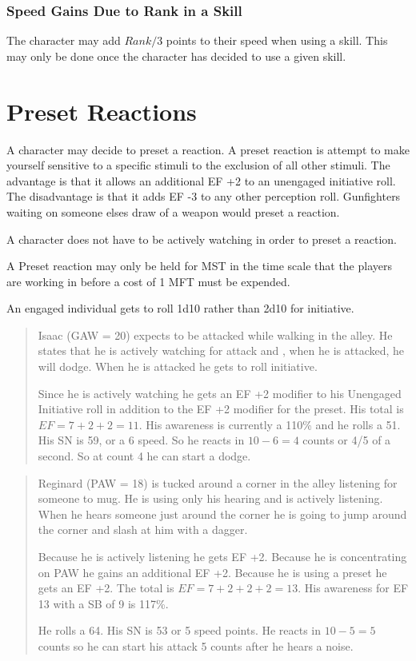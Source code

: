 

\subsubsection{Speed Gains Due to Rank in a Skill}

The character may add \( Rank/3 \) points to their speed when using a
skill. This may only be done once the character has decided to use a
given skill. 

\section{Preset Reactions}

A character may decide to preset a reaction. A preset reaction is 
attempt to make yourself sensitive to a specific stimuli to the exclusion
of all other stimuli. The advantage is that it allows an additional EF +2 
to an unengaged initiative roll. The disadvantage is that it adds EF 
-3 to any other perception roll. Gunfighters waiting on someone elses 
draw of a weapon would preset a reaction. 

A character does not have to be actively watching in order to preset 
a reaction.

A Preset reaction may only be held for MST in the time scale 
that the players are working in before a cost of 1 MFT must be 
expended.

An engaged individual gets to roll 1d10 rather than 2d10 for 
initiative.

\begin{quote}
Isaac (GAW = 20) expects to be attacked while walking in the alley. 
He states that he is actively watching for attack and , when he is 
attacked, he will dodge. When he is attacked he gets to roll 
initiative.  

Since he is actively watching he gets an EF +2 modifier to his 
Unengaged Initiative roll in addition to the EF +2 modifier for the preset. His 
total is \( EF = 7+2+2 = 11\). His awareness is currently a 110\% and
he rolls a 51. His SN is 59, or a 6 speed. So he reacts in \( 10 - 6
= 4 \) counts or 4/5 of a second. So at count 4 he can start a dodge.
\end{quote}

\begin{quote}
Reginard (PAW = 18) is tucked around a corner in the alley listening 
for someone to mug. He is using only his hearing and is actively 
listening. When he hears someone just around the corner he is going 
to jump around the corner and slash at him with a dagger.

Because he is actively listening he gets EF +2. Because he is 
concentrating on PAW he gains an additional EF +2. Because he is 
using a preset he gets an EF +2. The total is \( EF = 7+2+2+2 = 13\).
His awareness for EF 13 with a SB of 9 is 117\%. 

He rolls a 64. His SN is 53 or 5 speed points. He reacts in \( 10 - 5
= 5\) counts so he can start his attack 5 counts after he hears a
noise.
\end{quote}

